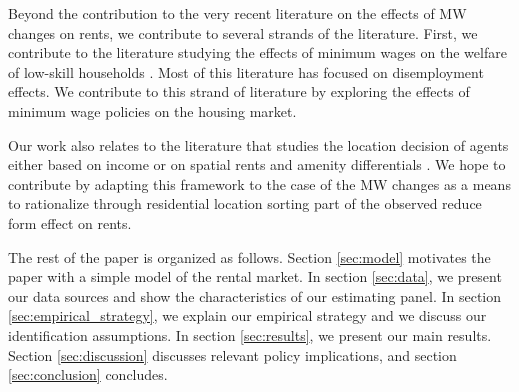

Beyond the contribution to the very recent literature on the effects of MW changes on rents, 
we contribute to several strands of the literature. First, we contribute to the literature 
studying the effects of minimum wages on the welfare of low-skill households \parencite[][among 
others]{DinardoEtAl1995, Lee1999, CardKrueger2000, Neumark2006, AutorEtAl2016, CegnizEtAl2019}. 
Most of this literature has focused on disemployment effects. We contribute to this strand of 
literature by exploring the effects of minimum wage policies on the housing market.

Our work also relates to the literature that studies the location decision of agents either 
based on income \parencite{Roback1982, Kennan2011, DesmetRossihansberg2013, PerezPerez2018, 
Monras2019} or on spatial rents and amenity differentials \parencite{Diamond2016, 
AlmagroDominguez2019, Couture2019}. We hope to contribute by adapting this framework to the 
case of the MW changes as a means to rationalize through residential location sorting part of 
the observed reduce form effect on rents.

The rest of the paper is organized as follows. Section \ref{sec:model} motivates the paper
with a simple model of the rental market. In section \ref{sec:data}, we present our data 
sources and show the characteristics of our estimating panel. In section 
\ref{sec:empirical_strategy}, we explain our empirical strategy and we discuss our 
identification assumptions. In section \ref{sec:results}, we present our main results. Section 
\ref{sec:discussion} discusses relevant policy implications, and 
section \ref{sec:conclusion} concludes.
